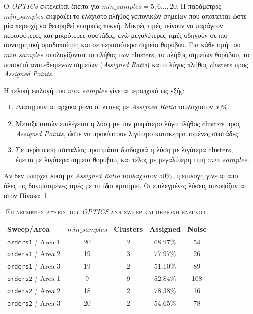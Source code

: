 \documentclass[a4paper,12pt,twoside,openright]{report}
\begin{document}
Ο \textit{OPTICS} εκτελείται έπειτα για \(min\_samples=5, 6\ldots,20\). Η παράμετρος \(min\_samples\) εκφράζει το ελάχιστο πλήθος γειτονικών σημείων που απαιτείται ώστε μία περιοχή να θεωρηθεί επαρκώς πυκνή. Μικρές τιμές τείνουν να παράγουν περισσότερες και μικρότερες συστάδες, ενώ μεγαλύτερες τιμές οδηγούν σε πιο συντηρητική ομαδοποίηση και σε περισσότερα σημεία θορύβου. Για κάθε τιμή του \(min\_samples\) υπολογίζονται το πλήθος των clusters, το πλήθος σημείων θορύβου, το ποσοστό ανατεθειμένων σημείων (\textit{Assigned Ratio}) και ο λόγος πλήθος clusters προς \textit{Assigned Points}.

Η τελική επιλογή του \(min\_samples\) γίνεται ιεραρχικά ως εξής:
\begin{enumerate}
    \item Διατηρούνται αρχικά μόνο οι λύσεις με \textit{Assigned Ratio} τουλάχιστον \(50\%\).
    \item Μεταξύ αυτών επιλέγεται η λύση με τον μικρότερο λόγο πλήθος clusters προς \textit{Assigned Points}, ώστε να προκύπτουν λιγότερο κατακερματισμένες συστάδες.
    \item Σε περίπτωση ισοπαλίας προτιμάται διαδοχικά η λύση με λιγότερα clusters, έπειτα με λιγότερα σημεία θορύβου, και τέλος με μεγαλύτερη τιμή \(min\_samples\).
\end{enumerate}

Αν δεν υπάρχει λύση με \textit{Assigned Ratio} τουλάχιστον \(50\%\), η επιλογή γίνεται από όλες τις δοκιμασμένες τιμές με το ίδιο κριτήριο. Οι επιλεγμένες λύσεις συνοψίζονται στον Πίνακα~\ref{tab:optics_selected_summary_ambient}. 

\begin{table}[!t]
\centering
\caption{\textsc{Επιλεγμένες λύσεις του \textit{OPTICS} ανά sweep και περιοχή ελέγχου.}}
\label{tab:optics_selected_summary_ambient}
\footnotesize
\renewcommand{\arraystretch}{1.2}
\setlength{\tabcolsep}{4pt}
\begin{tabular}{lcccc}
\toprule
\textbf{Sweep/Area} & \textbf{$min\_samples$} & \textbf{Clusters} & \textbf{Assigned} & \textbf{Noise} \\
\midrule
\texttt{orders1} / Area 1 & 20 & 2 & 68.97\% & 54 \\
\texttt{orders1} / Area 2 & 19 & 3 & 77.97\% & 26 \\
\texttt{orders1} / Area 3 & 19 & 2 & 51.10\% & 89 \\
\texttt{orders2} / Area 1 & 9  & 9 & 52.84\% & 108 \\
\texttt{orders2} / Area 2 & 18 & 2 & 78.38\% & 16 \\
\texttt{orders2} / Area 3 & 20 & 2 & 54.65\% & 78 \\
\bottomrule
\end{tabular}
\end{table}
\end{document}
